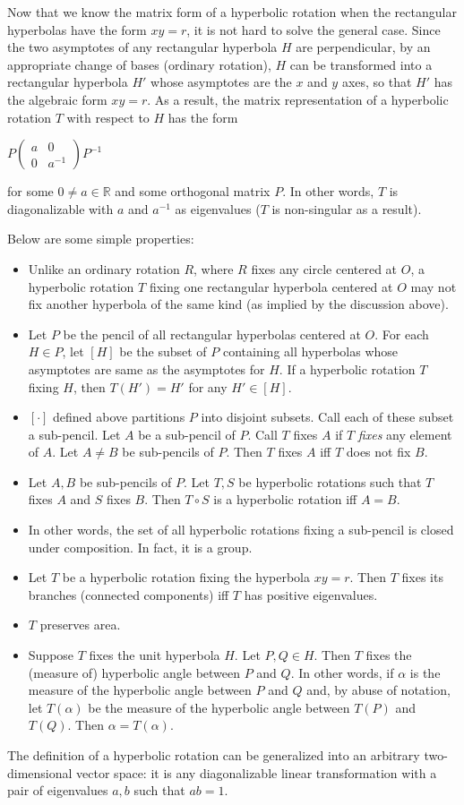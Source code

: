 \documentclass[12pt]{article}
\begin{document}
Now that we know the matrix form of a hyperbolic rotation when the rectangular hyperbolas have the form $xy=r$, it is not hard to solve the general case.  Since the two asymptotes of any rectangular hyperbola $H$ are perpendicular, by an appropriate change of bases (ordinary rotation), $H$ can be transformed into a rectangular hyperbola $H'$ whose asymptotes are the $x$ and $y$ axes, so that $H'$ has the algebraic form $xy=r$.  As a result, the matrix representation of a hyperbolic rotation $T$ with respect to $H$ has the form 
\begin{center}
$
P
\begin{pmatrix}
a & 0 \\
0 & a^{-1}
\end{pmatrix}
P^{-1}
$ 
\end{center}
for some $0\ne a\in\mathbb{R}$ and some orthogonal matrix $P$.  In other words, $T$ is diagonalizable with $a$ and $a^{-1}$ as eigenvalues ($T$ is non-singular as a result).

Below are some simple properties:
\begin{itemize}
\item Unlike an ordinary rotation $R$, where $R$ fixes any circle centered at $O$, a hyperbolic rotation $T$ fixing one rectangular hyperbola centered at $O$ may not fix another hyperbola of the same kind (as implied by the discussion above).
\item Let $P$ be the pencil of all rectangular hyperbolas centered at $O$.  For each $H\in P$, let $[H]$ be the subset of $P$ containing all hyperbolas whose asymptotes are same as the asymptotes for $H$.  If a hyperbolic rotation $T$ fixing $H$, then $T(H')=H'$ for any $H'\in [H]$.
\item $[\cdot]$ defined above partitions $P$ into disjoint subsets.  Call each of these subset a sub-pencil.  Let $A$ be a sub-pencil of $P$.  Call $T$ fixes $A$ if $T$ \emph{fixes} any element of $A$.  Let $A\ne B$ be sub-pencils of $P$.  Then $T$ fixes $A$ iff $T$ does not fix $B$.
\item Let $A,B$ be sub-pencils of $P$.  Let $T,S$ be hyperbolic rotations such that $T$ fixes $A$ and $S$ fixes $B$.  Then $T\circ S$ is a hyperbolic rotation iff $A=B$.
\item In other words, the set of all hyperbolic rotations fixing a sub-pencil is closed under composition.  In fact, it is a group.
\item Let $T$ be a hyperbolic rotation fixing the hyperbola $xy=r$.  Then $T$ fixes its branches (connected components) iff $T$ has positive eigenvalues.
\item $T$ preserves area.
\item Suppose $T$ fixes the unit hyperbola $H$.  Let $P,Q\in H$.  Then $T$ fixes the (measure of) hyperbolic angle between $P$ and $Q$.  In other words, if $\alpha$ is the measure of the hyperbolic angle between $P$ and $Q$ and, by abuse of notation, let $T(\alpha)$ be the measure of the hyperbolic angle between $T(P)$ and $T(Q)$.  Then $\alpha = T(\alpha)$.
\end{itemize}

The definition of a hyperbolic rotation can be generalized into an arbitrary two-dimensional vector space: it is any diagonalizable linear transformation with a pair of eigenvalues $a,b$ such that $ab=1$.
\end{document}
